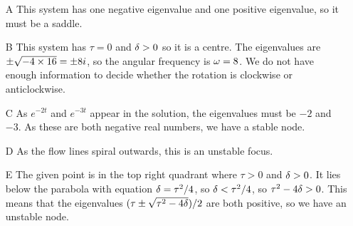 \documentclass[a4paper]{amsart}
\begin{document}
\begin{solution}\leavevmode
 \begin{itemize}
  \item[A] This system has one negative eigenvalue and one positive
   eigenvalue, so it must be a saddle.
  \item[B] This system has $\tau=0$ and $\delta>0$ so it is a centre.
   The eigenvalues are $\pm\sqrt{-4\times 16}=\pm 8i$, so the angular
   frequency is $\omega=8$.  We do not have enough information to decide
   whether the rotation is clockwise or anticlockwise.
  \item[C] As $e^{-2t}$ and $e^{-3t}$ appear in the solution, the
   eigenvalues must be $-2$ and $-3$.  As these are both negative real
   numbers, we have a stable node.
  \item[D] As the flow lines spiral outwards, this is an unstable
   focus.
  \item[E] The given point is in the top right quadrant where $\tau>0$
   and $\delta>0$.  It lies below the parabola with equation
   $\delta=\tau^2/4$, so $\delta<\tau^2/4$, so $\tau^2-4\delta>0$.  This means
   that the eigenvalues $(\tau\pm\sqrt{\tau^2-4\delta})/2$ are both
   positive, so we have an unstable node.
 \end{itemize}
\end{solution}
\end{document}
